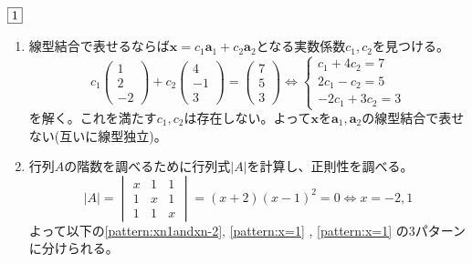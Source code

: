 \begin{souanswer} %
	$\fbox{1}$
\begin{enumerate}
	\item 線型結合で表せるならば$\bm{x}= c_1\bm{a}_1+ c_2\bm{a}_2$となる実数係数$c_1, c_2$を見つける。
\begin{equation*}
	c_1\begin{pmatrix}1\\ 2\\ -2\end{pmatrix}+ c_2\begin{pmatrix}4\\ -1\\ 3\end{pmatrix}= \begin{pmatrix}7\\ 5\\ 3\end{pmatrix}
	\iff
	\begin{cases}
		c_1+ 4c_2= 7\\
		2c_1- c_2= 5\\
		-2c_1+ 3c_2= 3
	\end{cases}
\end{equation*}
	を解く。これを満たす$c_1, c_2$は存在しない。よって$\bm{x}$を$\bm{a}_1, \bm{a}_2$の線型結合で表せない(互いに線型独立)。
	\item 行列$A$の階数を調べるために行列式$|A|$を計算し、正則性を調べる。
\begin{equation*}
	|A|= \begin{vmatrix}x& 1& 1\\ 1& x& 1\\ 1& 1& x\end{vmatrix}= (x+2)(x-1)^2= 0\iff x= -2, 1
\end{equation*}
	よって以下の\ref{pattern:xn1andxn-2}, \ref{pattern:x=1} , \ref{pattern:x=1} の3パターンに分けられる。
\end{enumerate}
\end{souanswer}
